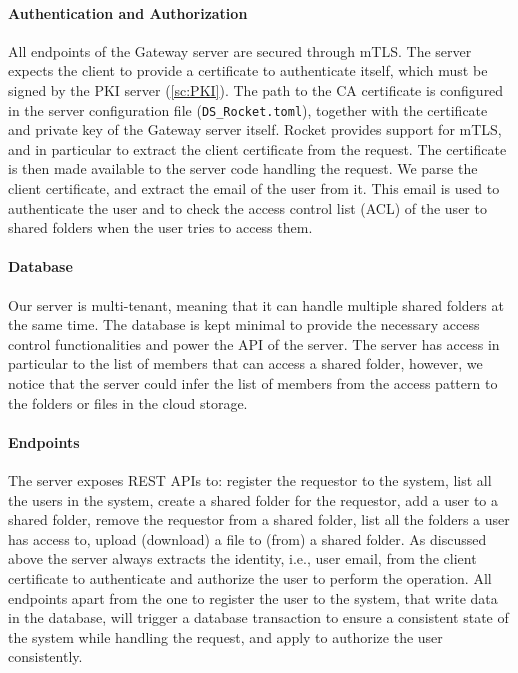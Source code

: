 \paragraph{Authentication and Authorization}
All endpoints of the Gateway server are secured through
mTLS. The server expects the client to provide a certificate
to authenticate itself, which must be signed by the
PKI server (\cref{sc:PKI}).
The path to the CA certificate is configured in the
server configuration file (\texttt{DS\_Rocket.toml}),
together with the certificate and private key of the
Gateway server itself. Rocket provides support for
mTLS, and in particular to extract the client
certificate from the request. The certificate is then
made available to the server code handling the request.
We parse the client certificate, and extract the email
of the user from it. This email is used to authenticate
the user and to check the access control list (ACL)
of the user to shared folders when the user tries to
access them.

\paragraph{Database}
Our server is multi-tenant, meaning that it can handle
multiple shared folders at the same time.
The database is kept minimal to provide the necessary 
access control functionalities and power the
API of the server. The server has access in particular
to the list of members that can access a shared folder, however,
we notice that the server could infer the list of members
from the access pattern to the folders or files
in the cloud storage.


\paragraph{Endpoints}
The server exposes REST APIs to: register the requestor to the system,
list all the users in the system,
create a shared folder for the requestor,
add a user to a shared folder,
remove the requestor from a shared folder,
list all the folders a user has access to,
upload (download) a file to (from) a shared folder.
As discussed above the server always extracts the identity,
i.e., user email, from the client certificate to authenticate
and authorize the user to perform the operation.
All endpoints apart from the one to register the user
to the system, that write data in the database,
will trigger a database transaction 
to ensure a consistent state of the system while
handling the request, and apply to authorize the
user consistently.

